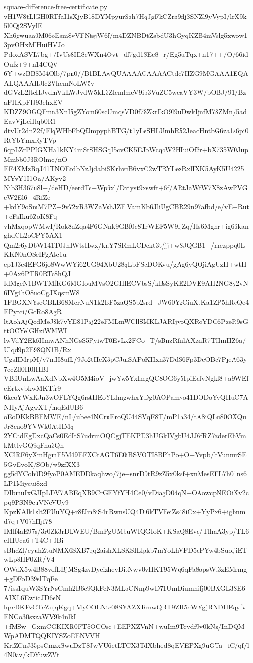 \documentclass[11pt]{article}
\theoremstyle{definition}
\theoremstyle{remark}
\begin{document}
\begin{filecontents*}[overwrite]{square-difference-free-certificate.py}
vH1W8tLlGH0RTfaI1sXjyB18DYMpyurSzh7HqJgFkCZrz9dj3SNZl9yVypI/lrX9k5l0Qj2SVyIE
Xh6gwuaa0M06oEsm8vVFNtsjW6f/m4DZNBDtZsbdU3hGyqKZB4mVslg5xwow13pvOHxMlHuiHVJo
PdoxASVL7bg+/IvUs8Hl8cWXn4Ovt+df7gd1SEc8+r/Eg5uTqx+n17++/O/66idOufz+9+n14CQV
6Y+wzBBSM4Olb/7pn0//B1BLAwQUAAAACAAAACtdc7HZG9MGAAA1EQAALQAAAHJlc2VhcmNoLW5v
dGVzL2ltcHJvdmVkLWJvdW5kL3ZlcmlmeV9ib3VuZC5weaVY3W/bOBJ/91/BzaFHKpFlJ93ehxEV
KDZZ9OGQFmn3XnI5gZYom60scUmqsVD0f78ZkrIkO9l9uDwkIjnfM78ZMn/5adEavVjLeiHqb0R1
dtvUr2dnZ2f/FlqWHbFbQfJmpyphBTG/t1yLeSHLUmhR52JeaoHntbG6za1s6pi0RtYbYmxRyTVp
6qpLZrPPIGXHa1kKY4mStSHSGqI5cvCK5EJbWcqcW2HIuiOf3r+bX735W0JupMmbb0J3ROlmo/nO
EF4XMzRqJ41TNOEtdbNzJjdabiSKrhvcB6vxC2wTRYLezRxlIXK5AyK5U4225MYvY1I1Oa/AKyv2
Nib3H367u8l+/deHD/eerdTc+Wp6xl/Dxiyst9xswft+6f/ARtJaWfW7X8zAwPVGcW2El6+4RfZe
+kdY9oSmM7PZ+9v72xR3WZaVshJZFiVamKb6JliUgCBR29n97afbd/e/vE+Rut+cFaIku6ZoK8Fq
vhMxqopWMwI/Rok8nZqa4F6GNnk9GBf0c8TrWEF5W9ljZq/Hs6Mghr+ig66kanghdCL2oCPY5AX1
Qm2r6yDbW141T0JnIWtsHwx/knY7SRmLCDckt3t/jj+wSJQGB1+/mezppq0LKKN0nOSeIFgAtc1u
ep1J3e4EFG6jo8WwWYi62UG94XbU28qLbFScDOKvu/gAg6yQOjiAgUzH+wtH+0Ax6PTR0RTc8hQJ
IdMgeN1BWTMfKG6MGIouMVsO2GHIECVbsS/kBsSyKE2DVE9AH2NG8y2vN6IYg4hO8uoCgJXqsmW8
1FBGXNYseCBLB68McrNuN1k2BF5zaQS5b2srd+JW60YzCiuXtKa1ZP5hRcQe4EPyrci/GoRo8AgR
ltAohAjQodMeJ8k7vYE81Paj22eFMLmWCllSMKLJARIjvoQXRcYDC6PzeR9sGttOCYelGHziWMWI
lwVdY2Ek6HmwANhNGsS5PyiwT0EvLx2FCo+T/sBnzRfnlAXznR7THmHZ6a/Ulqd9p2E98QN1B/Rx
UgsHMrpM/v7mH8ufL/9Jo2tHeX3pCJuiSAPoKHxn37DdS6Fp3DeOBe7PjeA63y7ccZfl0H0l1IBI
VBfiUnLwAaXdNbXw4O5M4ioV+jwYw5YxImgQC8OG6y5IpiEcfvNgkl8+a9WEfeErtxvbkwMKTfr9
6keoYWxKJn3wOFLYQg6rstHEoYLImgwhxYDg0AOPamvo41DODoYvQHuC7ANHyAjAgwXT/mqEdUB6
oEoDKkBBFMWE/nL/ubee4NCruEroQU44SVqF8T/mP1a34/tA8iQLu80OXQuJr8cno9YVWk0AtHMq
2YCtdEgDxcQaCs0EdItS7udrmOQCgjTEKPD3hUGkIVgbU4JJ6fRZ7zderEbVmkMtIvGQ9qFnu3Qn
XClRF6yXmHgmF5M49EFXCtAGT6E0iBSVOTI8BPhPo+O+Yvpb/bVunmrSE5GvEvoK/SOb/w9zfXX3
gg5dYCoh0D9fyoP0AMEDDkaqhwo/7je+snrD0tR9zZ5x0ksf+xnMesEFL7h01ns6LP1Miyeui8xd
DIbmuIxGJIpLDV7ABEqXB9CrGEYfYH4Ce0/vDiagD04qN+OAowcpNEOiXv2cpq9PSN9euVNeVUy9
KpzKAlk1zlt2FUuYQ+r8fJm8iS4uRwnsUQ4Di6kTVFeiZs48iCx+YyPx6+igbnmd7q+V07hHjf78
IMlf4aE97s/3r0Zk3rDLWEU/BmPgUMbuWIQGIoK+KSaQ8Evc/TlhaA3yp/TL6cHIUca6+T4C+0Bi
sBhcZl/eyuhZtuNMX6SXB7qq2aishXLSKSILlpkb7mYoLhVFD5ePYw4bSuoljiETwLp8HF0ZR/V4
OWdX5w4B88vofLBjMSg4zvDyeizhevDitNwv0vHKT95Wq6qFa8opsWl3zEMrmg+gDFoD39slTqEe
7/iss1quW3SYrNsCmh2B6e9QkFcN3MLoCNnp9wD71UmDiumhifj00BXGL3SE6AIXL6EwiicJD6eN
hpeDKFzGTeZujqKgq+MyOOLNtc08SYAZXRmwQBT9ZH5eWYgjRNDHEqyfvENOo30sxzaWV9k4nlkI
+fMSw+GxmCGKIXR0FT5OCOsc+EEPXZVnN+wuIm9Tcvdf9v0kNz/InDQMWpADMTQQKIYSZoEENVVH
KriZCnJ35psCmzxSwuDzT8JwVU6etLTCX3TdXbhod8qEVEPXg9uGTa+iC/qf/l4N0av/kDYuwZVt

\end{filecontents*}
\end{document}
